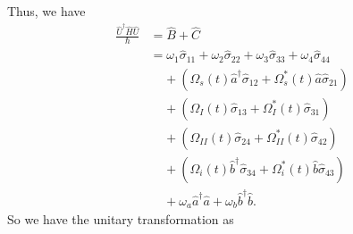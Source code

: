 \documentclass[aps,pra,showpacs,amsmath,amssymb,nofootinbib,longbibliography,superscriptaddress
]{revtex4-1}
\theoremstyle{definition}
\theoremstyle{remark}
\newcommand{\0}{\hat{0}}
\begin{document}
Thus, we have
\begin{align}
    \frac{\hat{U}^{\dagger} \hat{H} \hat{U}}{\hbar}
    &=
    \hat{B} + \hat{C} \nonumber\\
    &=
    \omega_1 \hat{\sigma}_{11} + \omega_2 \hat{\sigma}_{22} + \omega_3 \hat{\sigma}_{33} + \omega_4 \hat{\sigma}_{44} \nonumber \\
    &\;\;\;\;+
    \left(
        \Omega_{s}(t) \hat{a}^{\dagger} \hat{\sigma}_{12} +
        \Omega_{s}^*(t) \hat{a} \hat{\sigma}_{21}
    \right) \nonumber \\
    &\;\;\;\;+
    \left(
        \Omega_{I}(t) \hat{\sigma}_{13} +
        \Omega_{I}^*(t) \hat{\sigma}_{31}
    \right)\nonumber \\
    &\;\;\;\;+
    \left(
        \Omega_{II}(t) \hat{\sigma}_{24}
        + \Omega_{II}^*(t) \hat{\sigma}_{42}
    \right) \nonumber \\
    &\;\;\;\;+
    \left(
        \Omega_{i}(t) \hat{b}^{\dagger} \hat{\sigma}_{34} +
        \Omega_{i}^*(t) \hat{b} \hat{\sigma}_{43}
    \right) \nonumber \\
    &\;\;\;\;+
    \omega_{a} \hat{a}^{\dagger}\hat{a} +
    \omega_{b} \hat{b}^{\dagger}\hat{b}.
\end{align}
So we have the unitary transformation as
\end{document}
